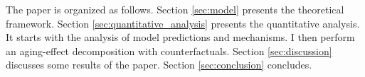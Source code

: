 %


The paper is organized as follows. Section \ref{sec:model} presents the theoretical framework. Section \ref{sec:quantitative_analysis} presents the quantitative analysis. It starts with the analysis of model predictions and mechanisms. I then perform an aging-effect decomposition with counterfactuals. Section \ref{sec:discussion} discusses some results of the paper. Section \ref{sec:conclusion} concludes.

